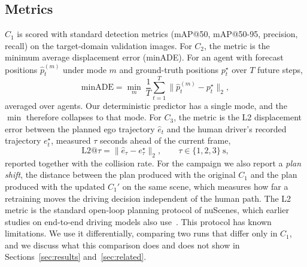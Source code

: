 \documentclass[conference]{IEEEtran}
\begin{document}
\subsection{Metrics}
\label{sec:metrics}
$C_1$ is scored with standard detection metrics (mAP@50, mAP@50-95, precision,
recall) on the target-domain validation images. For $C_2$, the metric is the
minimum average displacement error (minADE). For an agent with forecast positions
$\hat{p}^{(m)}_{t}$ under mode $m$ and ground-truth positions $p^{\star}_{t}$ over
$T$ future steps,
\begin{equation}
\mathrm{minADE} = \min_{m}\ \frac{1}{T}\sum_{t=1}^{T}
\bigl\lVert \hat{p}^{(m)}_{t} - p^{\star}_{t} \bigr\rVert_2 ,
\label{eq:minade}
\end{equation}
averaged over agents. Our deterministic predictor has a single mode, and the
$\min$ therefore collapses to that mode. For $C_3$, the metric is the L2 displacement error between
the planned ego trajectory $\hat{e}_t$ and the human driver's recorded trajectory
$e^{\star}_t$, measured $\tau$ seconds ahead of the current frame,
\begin{equation}
\mathrm{L2}@\tau = \bigl\lVert \hat{e}_{\tau} - e^{\star}_{\tau} \bigr\rVert_2 ,
\qquad \tau \in \{1,2,3\}\ \text{s},
\label{eq:l2}
\end{equation}
reported together with the collision rate. For the campaign we also report a
\emph{plan shift}, the distance between the plan produced with the original $C_1$
and the plan produced with the updated $C_1'$ on the same scene, which measures how
far a retraining moves the driving decision independent of the human path. The L2
metric is the standard open-loop planning protocol of nuScenes, which earlier
studies on end-to-end driving models also
use~\cite{hu2023uniad,jiang2023vad,zhai2023rethinking}. This protocol has known
limitations. We use it differentially, comparing two runs that differ only in
$C_1$, and we discuss what this comparison does and does not show in
Sections~\ref{sec:results} and~\ref{sec:related}.
\end{document}
